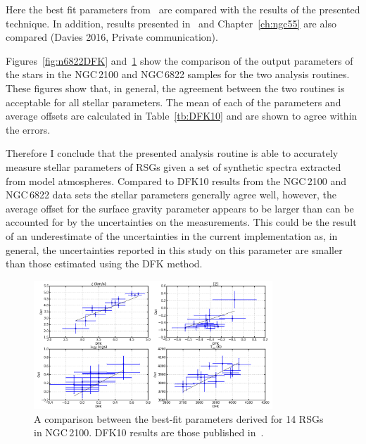 Here the best fit parameters from~\cite{2015ApJ...803...14P} are compared with the results of the presented technique.
In addition, results presented in~\citep{2016arXiv160202702P} and Chapter~\ref{ch:ngc55} are also compared (Davies 2016, Private communication).

Figures~\ref{fig:n6822DFK} and~\ref{fig:n2100DFK} show the comparison of the output parameters of the stars in the NGC\,2100 and NGC\,6822 samples for the two analysis routines.
These figures show that, in general, the agreement between the two routines is acceptable for all stellar parameters.
The mean of each of the parameters and average offsets are calculated in Table~\ref{tb:DFK10} and are shown to agree within the errors.


Therefore I conclude that the presented analysis routine is able to accurately measure stellar parameters of RSGs given a set of synthetic spectra extracted from model atmospheres.
Compared to DFK10 results from the NGC\,2100 and NGC\,6822 data sets the stellar parameters generally agree well, however, the average offset for the surface gravity parameter appears to be larger than can be accounted for by the uncertainties on the measurements.
This could be the result of an underestimate of the uncertainties in the current implementation as, in general, the uncertainties reported in this study on this parameter are smaller than those estimated using the DFK method.

\begin{figure}
 \centering
 \includegraphics[width=0.80\textwidth]{JAnal/NGC2100-par-compare}
 \caption[NGC\,2100 DFK10 best fit parameter comparison]{
A comparison between the best-fit parameters derived for 14 RSGs in NGC\,2100.
DFK10 results are those published in~\cite{2016arXiv160202702P}.
\label{fig:n2100DFK}
         }
\end{figure}

